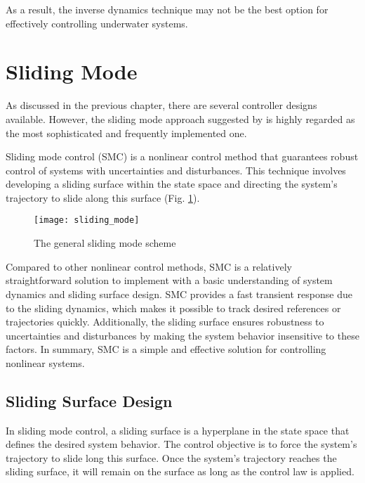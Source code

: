     As a result, the inverse dynamics technique may not be the best option for effectively 
    controlling underwater systems.

    

\section{Sliding Mode}

    As discussed in the previous chapter, there are several controller
    designs available. However, the sliding mode approach suggested by 
    is highly regarded as the most sophisticated and frequently implemented one.

    Sliding mode control (SMC) is a nonlinear control method that guarantees
    robust control of systems with uncertainties and disturbances.
    This technique involves developing a sliding surface within the state
    space and directing the system's trajectory to slide along this surface (Fig. \ref{image:sliding_mode}).

    \begin{figure}[H]
        \centering\texttt{[image: sliding\_mode]}
        \caption{The general sliding mode scheme}
        \label{image:sliding_mode}
    \end{figure}

    Compared to other nonlinear control methods, SMC is a relatively straightforward
    solution to implement with a basic understanding of system dynamics and sliding
    surface design. SMC provides a fast transient response due to the sliding dynamics, which makes 
    it possible to track desired references or trajectories quickly. Additionally, 
    the sliding surface ensures robustness to uncertainties and disturbances by 
    making the system behavior insensitive to these factors. In summary, SMC is a 
    simple and effective solution for controlling nonlinear systems.

\subsection{Sliding Surface Design}

    In sliding mode control, a sliding surface is a hyperplane in
    the state space that defines the desired system behavior.
    The control objective is to force the system's trajectory to slide
    long this surface. Once the system's trajectory reaches the sliding surface,
    it will remain on the surface as long as the control law is applied.

